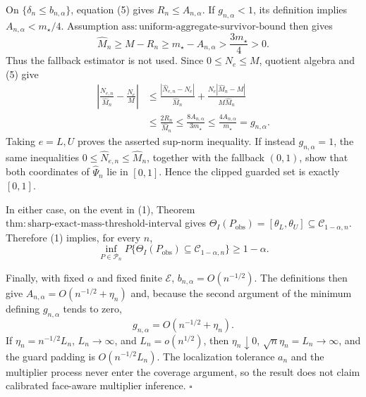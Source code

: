 On \(\{\delta_n\le b_{n,\alpha}\}\), equation (5) gives
\(R_n\le A_{n,\alpha}\).  If \(g_{n,\alpha}<1\), its definition implies
\(A_{n,\alpha}<m_{\star}/4\).  Assumption
\(\mathrm{ass{:}uniform\text{-}aggregate\text{-}survivor\text{-}bound}\)
then gives
\[
\widehat M_n\ge M-R_n
\ge m_{\star}-A_{n,\alpha}>\frac{3m_{\star}}4>0.
\]
Thus the fallback estimator is not used.  Since
\(0\le N_e\le M\), quotient algebra and (5) give
\[
\begin{aligned}
\left|\frac{\widehat N_{e,n}}{\widehat M_n}-\frac{N_e}{M}\right|
&\le\frac{|\widehat N_{e,n}-N_e|}{\widehat M_n}
 +\frac{N_e|\widehat M_n-M|}{M\widehat M_n}\\
&\le\frac{2R_n}{\widehat M_n}
\le\frac{8A_{n,\alpha}}{3m_{\star}}
\le\frac{4A_{n,\alpha}}{m_{\star}}
=g_{n,\alpha}.
\end{aligned}
\tag{6}
\]
Taking \(e=L,U\) proves the asserted sup-norm inequality.  If instead
\(g_{n,\alpha}=1\), the same inequalities
\(0\le\widehat N_{e,n}\le\widehat M_n\), together with the fallback
\((0,1)\), show that both coordinates of \(\widehat\Psi_n\) lie in
\([0,1]\).  Hence the clipped guarded set is exactly \([0,1]\).

In either case, on the event in (1), Theorem
\(\mathrm{thm{:}sharp\text{-}exact\text{-}mass\text{-}threshold\text{-}interval}\)
gives
\(\Theta_I(P_{\mathrm{obs}})=[\theta_L,\theta_U]\subseteq
\mathcal C_{1-\alpha,n}\).  Therefore (1) implies, for every \(n\),
\[
\inf_{P\in\mathcal P_n}
P\{\Theta_I(P_{\mathrm{obs}})\subseteq\mathcal C_{1-\alpha,n}\}
\ge1-\alpha.
\]

Finally, with fixed \(\alpha\) and fixed finite \(\mathcal E\),
\(b_{n,\alpha}=O(n^{-1/2})\).  The definitions then give
\(A_{n,\alpha}=O(n^{-1/2}+\eta_n)\) and, because the second argument of
the minimum defining \(g_{n,\alpha}\) tends to zero,
\[
g_{n,\alpha}=O(n^{-1/2}+\eta_n).
\]
If \(\eta_n=n^{-1/2}L_n\), \(L_n\to\infty\), and
\(L_n=o(n^{1/2})\), then \(\eta_n\downarrow0\),
\(\sqrt n\eta_n=L_n\to\infty\), and the guard padding is
\(O(n^{-1/2}L_n)\).  The localization tolerance \(a_n\) and the
multiplier process never enter the coverage argument, so the result does
not claim calibrated face-aware multiplier inference. \(\square\)